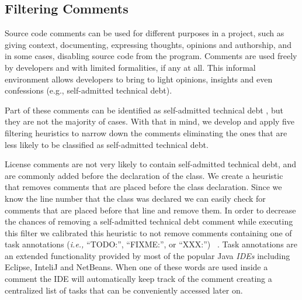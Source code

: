 \subsection{Filtering Comments}
\label{sub:filtering_comments}

Source code comments can be used for different purposes in a project, such as giving context, documenting, expressing thoughts, opinions and authorship, and in some cases, disabling source code from the program.  Comments are used freely by developers and with limited formalities, if any at all. This informal environment allows developers to bring to light opinions, insights and even confessions (e.g., self-admitted technical debt). 

Part of these comments can be identified as self-admitted technical debt \cite{Potdar2014ICSME},  but they are not the majority of cases. With that in mind, we develop and apply five filtering heuristics  to narrow down the comments eliminating the ones that are less likely to be classified as self-admitted technical debt. 

License comments are not very likely to contain self-admitted technical debt, and are commonly added before the declaration of the class. We create a heuristic that removes comments that are placed before the class declaration. Since we know the line number that the class was declared we can easily check for comments that are placed before that line and remove them. In order to decrease the chances of removing a self-admitted technical debt comment while executing this filter we calibrated this heuristic to not remove comments containing one of task annotations (\textit{i.e.,} ``TODO:'', ``FIXME:'', or ``XXX:'') ~\cite{Storey2008ICSE}. Task annotations are an extended functionality provided by most of the popular Java \textit{IDEs} including Eclipse, InteliJ and NetBeans. When one of these words are used inside a comment the IDE will automatically keep track of the comment creating a centralized list of tasks that can be conveniently accessed later on. 

